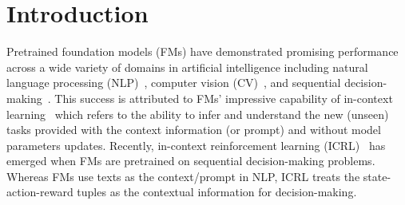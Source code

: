 %
%
\section{Introduction}



Pretrained foundation models (FMs) have demonstrated promising performance across a wide variety of domains in artificial intelligence including natural language processing (NLP)~\citep{devlin2018bert, radford2018improving, radford2019language, brown2020language}, computer vision (CV)~\citep{yuan2021florence, sammani2022nlx, ma2023crepe, chen2024internvl}, and sequential decision-making~\citep{chen2021decision, janner2021offline, xu2022prompting, yang2023foundation, light2024strategist, light2024pianist}. This success is attributed to FMs' impressive capability of in-context learning~\citep{dong2022survey, li2023transformers, wei2023larger, wies2024learnability} which refers to the ability to infer and understand the new (unseen) tasks provided with the context information (or prompt) and without model parameters updates.
%
Recently, in-context reinforcement learning (ICRL)~\citep{laskin2022context, grigsby2023amago, lin2023transformers, sinii2023context, zisman2023emergence, lee2024supervised, lu2024structured, wang2024transformers, dong2024context} has emerged when FMs are pretrained on sequential decision-making problems.
Whereas FMs use texts as the context/prompt in NLP, ICRL treats the state-action-reward tuples as the contextual information for decision-making. 

